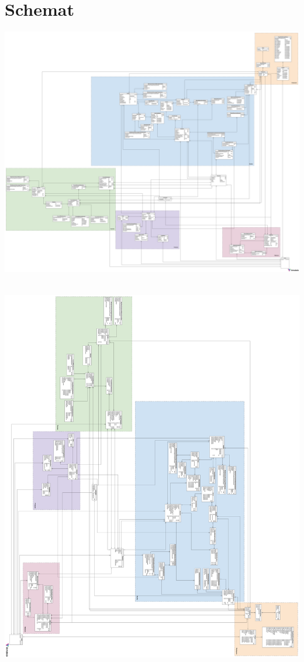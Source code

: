 \documentclass[11pt]{article}
\begin{document}
\section{Schemat}
\label{sec:orgd2d8cbe}
\begin{center}
\includegraphics[width=.9\linewidth]{./schemat.png}
\end{center}

\newpage
\begin{center}
\includegraphics[height=660px]{./schemat-rotated.png}
\end{center}
\end{document}
